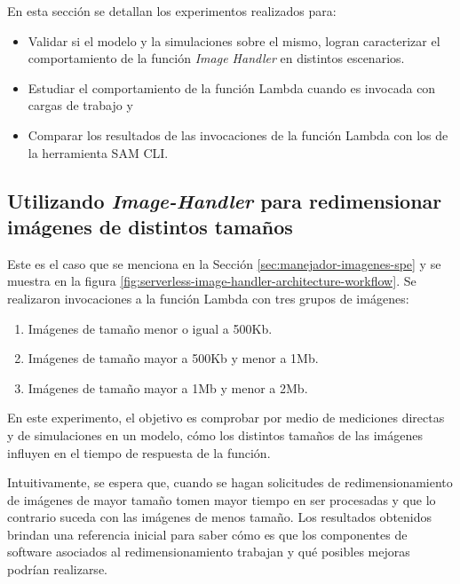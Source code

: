 En esta sección se detallan los experimentos realizados para:
\begin{itemize}
    \item Validar si el modelo y la simulaciones sobre el mismo, logran caracterizar el comportamiento de la función \emph{Image Handler} en distintos escenarios. 
    \item Estudiar el comportamiento de la función Lambda cuando es invocada con cargas de trabajo y
    \item Comparar los resultados de las invocaciones de la función Lambda con los de la herramienta SAM CLI.
\end{itemize}

\subsection{Utilizando \emph{Image-Handler} para redimensionar imágenes de distintos tamaños} \label{sec:experimento-1}

Este es el caso que se menciona en la Sección \ref{sec:manejador-imagenes-spe} y se muestra en la figura \ref{fig:serverless-image-handler-architecture-workflow}. Se realizaron invocaciones a la función Lambda con tres grupos de imágenes:
\begin{enumerate}
    \item Imágenes de tamaño menor o igual a 500Kb.
    \item Imágenes de tamaño mayor a 500Kb y menor a 1Mb.
    \item Imágenes de tamaño mayor a 1Mb y menor a 2Mb.
\end{enumerate}
En este experimento, el objetivo es comprobar por medio de mediciones directas y de simulaciones en un modelo, cómo los distintos tamaños de las imágenes influyen en el tiempo de respuesta de la función.

Intuitivamente, se espera que, cuando se hagan solicitudes de redimensionamiento de imágenes de mayor tamaño tomen mayor tiempo en ser procesadas y que lo contrario suceda con las imágenes de menos tamaño. Los resultados obtenidos brindan una referencia inicial para saber cómo es que los componentes de software asociados al redimensionamiento trabajan y qué posibles mejoras podrían realizarse.

